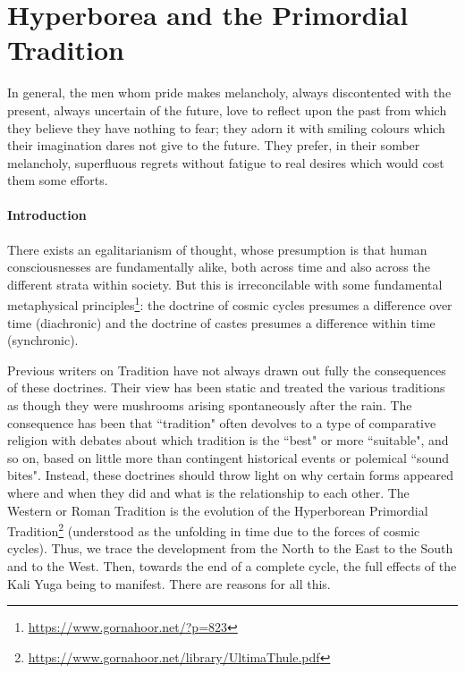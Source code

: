 \section{Hyperborea and the Primordial Tradition}

\begin{quotex}
In general, the men whom pride makes melancholy, always discontented with the present, always uncertain of the future, love to reflect upon the past from which they believe they have nothing to fear; they adorn it with smiling colours which their imagination dares not give to the future. They prefer, in their somber melancholy, superfluous regrets without fatigue to real desires which would cost them some efforts. 

\end{quotex}
\paragraph{Introduction}
There exists an egalitarianism of thought, whose presumption is that human consciousnesses are fundamentally alike, both across time and also across the different strata within society. But this is irreconcilable with some fundamental metaphysical principles\footnote{\url{https://www.gornahoor.net/?p=823}}: the doctrine of cosmic cycles presumes a difference over time (diachronic) and the doctrine of castes presumes a difference within time (synchronic).

Previous writers on Tradition have not always drawn out fully the consequences of these doctrines. Their view has been static and treated the various traditions as though they were mushrooms arising spontaneously after the rain. The consequence has been that ``tradition" often devolves to a type of comparative religion with debates about which tradition is the ``best" or more ``suitable", and so on, based on little more than contingent historical events or polemical ``sound bites". Instead, these doctrines should throw light on why certain forms appeared where and when they did and what is the relationship to each other. The Western or Roman Tradition is the evolution of the Hyperborean Primordial Tradition\footnote{\url{https://www.gornahoor.net/library/UltimaThule.pdf}} (understood as the unfolding in time due to the forces of cosmic cycles). Thus, we trace the development from the North to the East to the South and to the West. Then, towards the end of a complete cycle, the full effects of the Kali Yuga being to manifest. There are reasons for all this.

